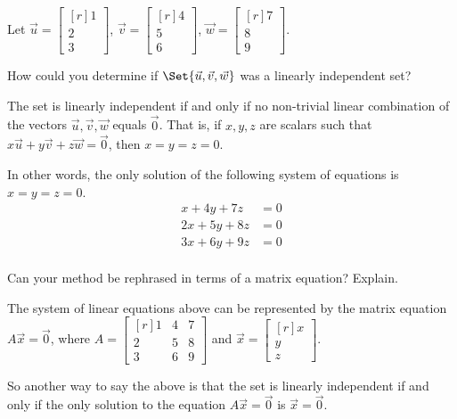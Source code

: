 \documentclass{problemset}
\newcommand{\mat}[1]{\begin{bmatrix*}[r]#1\end{bmatrix*}}
\begin{document}
	\question
	Let $\vec u=\mat{1\\2\\3}$, $\vec v=\mat{4\\5\\6}$, $\vec w=\mat{7\\8\\9}$.
	\begin{parts}
		\item How could you determine if $\Set{\vec u,\vec v,\vec w}$ was a linearly
			independent set?
			\begin{solution}
				The set is linearly independent if and only if no non-trivial linear
				combination of the vectors $\vec u,\vec v,\vec w$ equals $\vec 0$.
				That is, if $x, y, z$ are scalars such that
				$x\vec u+y\vec v+z\vec w=\vec 0$, then $x=y=z=0$.

				In other words, the only solution of the following
				system of equations is $x=y=z=0$.
				\begin{align*}
					x + 4y + 7z &= 0 \\
					2x + 5y + 8z &= 0 \\
					3x + 6y + 9z &= 0 \\
				\end{align*}
			\end{solution}
		\item Can your method be rephrased in terms of a matrix equation? Explain.
			\begin{solution}
				The system of linear equations above can be represented by the
				matrix equation $A\vec x = \vec 0$, where $A = \mat{1&4&7\\2&5&8\\3&6&9}$
				and $\vec x=\mat{x\\y\\z}$.

				So another way to say the above is that the set is linearly independent
				if and only if the only solution to the equation $A \vec x = \vec 0$
				is $\vec x = \vec 0$.
			\end{solution}
	\end{parts}
\end{document}
